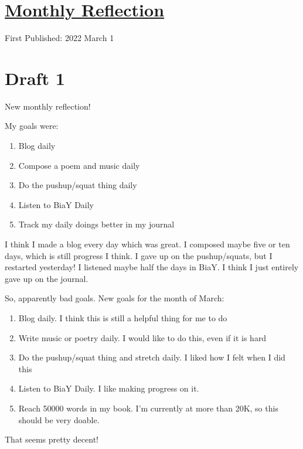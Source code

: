 \documentclass[12pt]{article}[titlepage]
\renewcommand{\,}{\textsuperscript{,}}
\begin{document}
\doublespacing
\section{\href{reflection-february-22.html}{Monthly Reflection}}
First Published: 2022 March 1

\section{Draft 1}
New monthly reflection!

My goals were:
\begin{enumerate}
\item Blog daily
\item Compose a poem and music daily
\item Do the pushup/squat thing daily
\item Listen to BiaY Daily
\item Track my daily doings better in my journal
\end{enumerate}
I think I made a blog every day which was great.
I composed maybe five or ten days, which is still progress I think.
I gave up on the pushup/squats, but I restarted yesterday!
I listened maybe half the days in BiaY.
I think I just entirely gave up on the journal.

So, apparently bad goals.
New goals for the month of March:
\begin{enumerate}
\item Blog daily. I think this is still a helpful thing for me to do
\item Write music or poetry daily. I would like to do this, even if it is hard
\item Do the pushup/squat thing and stretch daily. I liked how I felt when I did this
\item Listen to BiaY Daily. I like making progress on it.
\item Reach 50000 words in my book. I'm currently at more than 20K, so this should be very doable.
\end{enumerate}
That seems pretty decent!
\end{document}

